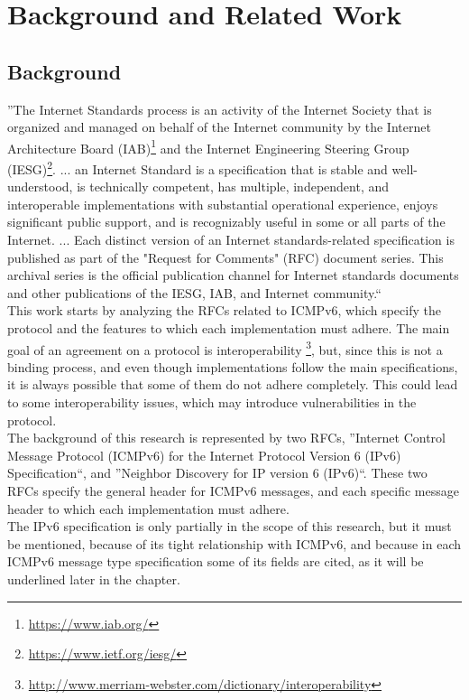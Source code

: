 \documentclass[12pt]{article}
\begin{document}
 

\pagebreak
\section{Background and Related Work}
\label{sec:2}


\subsection{Background}
\label{sub:background}

''The Internet Standards process is an activity of the Internet Society that is organized and managed on behalf of the Internet community by the Internet Architecture Board (IAB)\footnote{\url{https://www.iab.org/}} and 
the Internet Engineering Steering 
Group (IESG)\footnote{\url{https://www.ietf.org/iesg/}}.
... an Internet Standard is a specification that is stable and well-understood, is technically competent, has multiple, independent, and interoperable implementations with substantial operational experience, 
enjoys significant public support, and is recognizably useful in some or all parts of the Internet. ... Each distinct version of an Internet standards-related specification is published as part of the "Request for 
Comments" (RFC) document series.  This archival series is the official publication channel for Internet standards documents and other publications of the IESG, IAB, and Internet community.``\cite{rfc2026}\\

This work starts by analyzing the RFCs related to ICMPv6, which specify the protocol and the features to which each implementation must adhere. The main goal of an agreement on a protocol is interoperability
\footnote{\url{http://www.merriam-webster.com/dictionary/interoperability}}, but, since this is not a binding process, and even though implementations follow the main specifications, it is always possible that some of 
them do not adhere completely. This could lead to some interoperability issues, which may introduce vulnerabilities in the protocol.\\
The background of this research is represented by two RFCs, ''Internet Control Message Protocol (ICMPv6) for the Internet Protocol Version 6 (IPv6) Specification``\cite{rfc4443}, and ''Neighbor Discovery for IP version 6 
(IPv6)``\cite{rfc4861}. These two RFCs specify the general header for ICMPv6 messages, and each specific message header to which each implementation must adhere.\\
The IPv6 specification\cite{rfc2460} is only partially in the scope of this research, but it must be mentioned, because of its tight relationship with ICMPv6, and because in each ICMPv6 message type specification some of 
its fields are cited, as it will be underlined later in the chapter.\\
\end{document}
